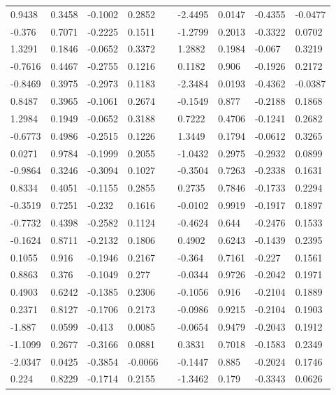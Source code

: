 \begin{table}[h!]
\begin{tabular}{lllllllll}
0.9438 & 0.3458 & -0.1002 & 0.2852 &  & -2.4495 & 0.0147 & -0.4355 & -0.0477 \\
-0.376 & 0.7071 & -0.2225 & 0.1511 &  & -1.2799 & 0.2013 & -0.3322 & 0.0702 \\
1.3291 & 0.1846 & -0.0652 & 0.3372 &  & 1.2882 & 0.1984 & -0.067 & 0.3219 \\
-0.7616 & 0.4467 & -0.2755 & 0.1216 &  & 0.1182 & 0.906 & -0.1926 & 0.2172 \\
-0.8469 & 0.3975 & -0.2973 & 0.1183 &  & -2.3484 & 0.0193 & -0.4362 & -0.0387 \\
0.8487 & 0.3965 & -0.1061 & 0.2674 &  & -0.1549 & 0.877 & -0.2188 & 0.1868 \\
1.2984 & 0.1949 & -0.0652 & 0.3188 &  & 0.7222 & 0.4706 & -0.1241 & 0.2682 \\
-0.6773 & 0.4986 & -0.2515 & 0.1226 &  & 1.3449 & 0.1794 & -0.0612 & 0.3265 \\
0.0271 & 0.9784 & -0.1999 & 0.2055 &  & -1.0432 & 0.2975 & -0.2932 & 0.0899 \\
-0.9864 & 0.3246 & -0.3094 & 0.1027 &  & -0.3504 & 0.7263 & -0.2338 & 0.1631 \\
0.8334 & 0.4051 & -0.1155 & 0.2855 &  & 0.2735 & 0.7846 & -0.1733 & 0.2294 \\
-0.3519 & 0.7251 & -0.232 & 0.1616 &  & -0.0102 & 0.9919 & -0.1917 & 0.1897 \\
-0.7732 & 0.4398 & -0.2582 & 0.1124 &  & -0.4624 & 0.644 & -0.2476 & 0.1533 \\
-0.1624 & 0.8711 & -0.2132 & 0.1806 &  & 0.4902 & 0.6243 & -0.1439 & 0.2395 \\
0.1055 & 0.916 & -0.1946 & 0.2167 &  & -0.364 & 0.7161 & -0.227 & 0.1561 \\
0.8863 & 0.376 & -0.1049 & 0.277 &  & -0.0344 & 0.9726 & -0.2042 & 0.1971 \\
0.4903 & 0.6242 & -0.1385 & 0.2306 &  & -0.1056 & 0.916 & -0.2104 & 0.1889 \\
0.2371 & 0.8127 & -0.1706 & 0.2173 &  & -0.0986 & 0.9215 & -0.2104 & 0.1903 \\
-1.887 & 0.0599 & -0.413 & 0.0085 &  & -0.0654 & 0.9479 & -0.2043 & 0.1912 \\
-1.1099 & 0.2677 & -0.3166 & 0.0881 &  & 0.3831 & 0.7018 & -0.1583 & 0.2349 \\
-2.0347 & 0.0425 & -0.3854 & -0.0066 &  & -0.1447 & 0.885 & -0.2024 & 0.1746 \\
0.224 & 0.8229 & -0.1714 & 0.2155 &  & -1.3462 & 0.179 & -0.3343 & 0.0626 \\

\end{tabular}
\end{table}
